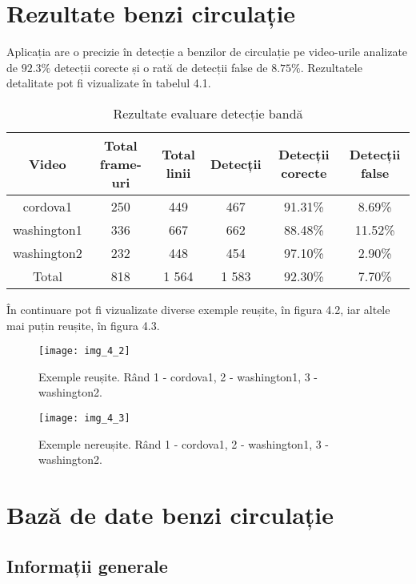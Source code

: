 \section{Rezultate benzi circulație}

Aplicația are o precizie în detecție a benzilor de circulație pe video-urile analizate de $92.3\%$ detecții corecte și o rată de detecții false de $8.75\%$. Rezultatele detalitate pot fi vizualizate în tabelul 4.1.

\begin{table}[h!]
	\centering
	\begin{tabular}{||c | c | c | c | c | c ||} 
		\hline
		Video & Total frame-uri & Total linii & Detecții & Detecții corecte & Detecții false \\ [0.5ex] 
		\hline\hline
		cordova1 & 250 & 449 & 467 & 91.31\% & 8.69\%  \\ 
		washington1 & 336 & 667 & 662 & 88.48\% & 11.52\% \\
		washington2 & 232 & 448 & 454 & 97.10\% & 2.90\%  \\ 
		\hline\hline
		Total & 818 & 1 564 & 1 583 & 92.30\% & 7.70\% \\ [1ex]
		
		\hline
	\end{tabular}
	\caption{Rezultate evaluare detecție bandă}
	\label{table:1}
\end{table}

În continuare pot fi vizualizate diverse exemple reușite, în figura 4.2, iar altele mai puțin reușite, în figura 4.3.

\begin{figure}[!h]
	\centering
	\texttt{[image: img\_4\_2]}
	\caption[Detecție bandă - exemple reușite]{Exemple reușite. Rând 1 - cordova1, 2 - washington1, 3 - washington2.}
\end{figure}
\begin{figure}[!h]
	\centering
	\texttt{[image: img\_4\_3]}
	\caption[Detecție bandă - exemple nereușite]{Exemple nereușite. Rând 1 - cordova1, 2 - washington1, 3 - washington2.}
\end{figure}

\section{Bază de date benzi circulație}
\subsection*{Informații generale}

